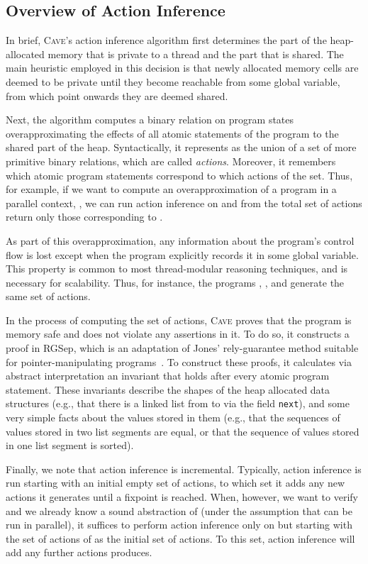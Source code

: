 \documentclass{LMCS}
\begin{document}
\subsection*{Overview of Action Inference}

In brief, \textsc{Cave}'s action inference algorithm first determines the part of
the heap-allocated memory that is private to a thread and the part that is shared. 
The main heuristic employed in this decision is that newly allocated memory 
cells are deemed to be private until they become reachable from some global 
variable, from which point onwards they are deemed shared.

Next, the algorithm computes a binary relation  on program states 
overapproximating the effects of all atomic statements of the program 
to the shared part of the heap. 
Syntactically, it represents  as the union of a set of more primitive 
binary relations, which are called \emph{actions}.
Moreover, it remembers which atomic program statements correspond 
to which actions of the set.
Thus, for example, if we want to compute an overapproximation of a 
program  in a parallel context, , we can run action inference
on  and from the total set of actions return only those corresponding
to . 

As part of this overapproximation, any information about the program's 
control flow is lost except when the program explicitly records it in some 
global variable.  This property is common to most thread-modular 
reasoning techniques, and is necessary for scalability.
Thus, for instance, the programs , , and  generate 
the same set of actions.

In the process of computing the set of actions, \textsc{Cave} 
proves that the program is memory safe and does not violate any 
assertions in it. To do so, it constructs a proof in RGSep, which is an
adaptation of Jones' rely-guarantee method suitable for pointer-manipulating 
programs~\cite{Jon1983,VP2007}. 
To construct these proofs, it calculates via abstract interpretation
an invariant that holds after every atomic program statement.
These invariants describe the shapes of the heap allocated data structures
(e.g., that there is a linked list from  to  via the field \texttt{next}),
and some very simple facts about the values stored in them 
(e.g., that the sequences of values stored in two list segments are equal,
or that the sequence of values stored in one list segment is sorted).

Finally, we note that action inference is incremental. Typically, action inference 
is run starting with an initial empty set of actions, to which set it adds any new
actions it generates until a fixpoint is reached. 
When, however, we want to verify  and we already know a sound 
abstraction of  (under the assumption that  can be run in parallel), 
it suffices to perform action inference only on  but starting with the 
set of actions of  as the initial set of actions.
To this set, action inference will add any further actions  produces.
\end{document}
